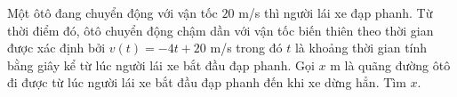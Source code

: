 \begin{ex}%
	Một ôtô đang chuyển động với vận tốc $20$ m/s thì người lái xe đạp phanh. Từ thời điểm đó, ôtô chuyển động chậm dần với vận tốc biến thiên theo thời gian được xác định bởi $v(t)=-4t+20$ m/s trong đó $t$ là khoảng thời gian tính bằng giây kể từ lúc người lái xe bắt đầu đạp phanh. Gọi $x$ m là quãng đường ôtô đi được từ lúc người lái xe bắt đầu đạp phanh đến khi xe dừng hẳn. Tìm $x$.
	
\end{ex}

